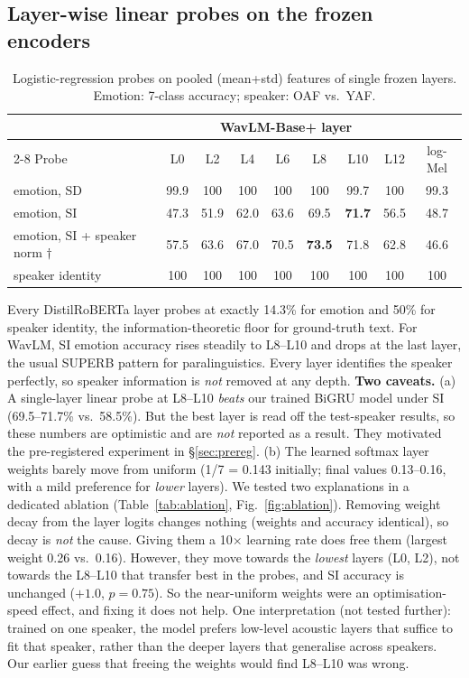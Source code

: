 \subsection{Layer-wise linear probes on the frozen encoders}
\begin{table}[H]\centering\small
\caption[Layer-wise linear probes on the frozen encoders]{Logistic-regression probes on pooled (mean+std) features of single frozen layers. Emotion: 7-class accuracy; speaker: OAF vs.\ YAF.}\label{tab:probe}
\begin{tabular}{@{}lcccccccc@{}}\toprule
& \multicolumn{7}{c}{WavLM-Base+ layer} & \\\cmidrule(lr){2-8}
Probe & L0 & L2 & L4 & L6 & L8 & L10 & L12 & log-Mel\\\midrule
emotion, SD & 99.9 & 100 & 100 & 100 & 100 & 99.7 & 100 & 99.3\\
emotion, SI & 47.3 & 51.9 & 62.0 & 63.6 & 69.5 & \textbf{71.7} & 56.5 & 48.7\\
emotion, SI + speaker norm $\dagger$ & 57.5 & 63.6 & 67.0 & 70.5 & \textbf{73.5} & 71.8 & 62.8 & 46.6\\
speaker identity & 100 & 100 & 100 & 100 & 100 & 100 & 100 & 100\\\bottomrule
\end{tabular}\end{table}
Every DistilRoBERTa layer probes at exactly 14.3\% for emotion and 50\% for speaker identity, the information-theoretic floor for ground-truth text.
For WavLM, SI emotion accuracy rises steadily to L8--L10 and drops at the last layer, the usual SUPERB pattern for paralinguistics.
Every layer identifies the speaker perfectly, so speaker information is \emph{not} removed at any depth.
\textbf{Two caveats.}
(a) A single-layer linear probe at L8--L10 \emph{beats} our trained BiGRU model under SI (69.5--71.7\% vs.\ 58.5\%).
But the best layer is read off the test-speaker results, so these numbers are optimistic and are \emph{not} reported as a result. They motivated the pre-registered experiment in \S\ref{sec:prereg}.
(b) The learned softmax layer weights barely move from uniform (1/7 = 0.143 initially; final values 0.13--0.16, with a mild preference for \emph{lower} layers).
We tested two explanations in a dedicated ablation (Table~\ref{tab:ablation}, Fig.~\ref{fig:ablation}).
Removing weight decay from the layer logits changes nothing (weights and accuracy identical), so decay is \emph{not} the cause.
Giving them a 10$\times$ learning rate does free them (largest weight 0.26 vs.\ 0.16). However, they move towards the \emph{lowest} layers (L0, L2), not towards the L8--L10 that transfer best in the probes, and SI accuracy is unchanged ($+1.0$\pp, $p=0.75$).
So the near-uniform weights were an optimisation-speed effect, and fixing it does not help.
One interpretation (not tested further): trained on one speaker, the model prefers low-level acoustic layers that suffice to fit that speaker, rather than the deeper layers that generalise across speakers.
Our earlier guess that freeing the weights would find L8--L10 was wrong.

